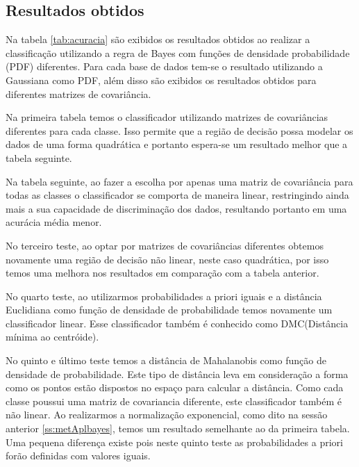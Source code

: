 \documentclass[ 
	article,			%
	11pt,				%
	oneside,			%
	a4paper,			%
	english,			%
	brazil,				%
	]{abntex2}
\begin{document}
 
\subsection{Resultados obtidos}
\label{ss:resultadosObtidos}

Na tabela \ref{tab:acuracia} são exibidos os resultados obtidos ao realizar a
classificação utilizando a regra de Bayes com funções de densidade probabilidade
(PDF) diferentes. Para cada base de dados tem-se o resultado utilizando a
Gaussiana como PDF, além disso são exibidos os resultados obtidos para
diferentes matrizes de covariância.

Na primeira tabela temos o classificador utilizando matrizes de covariâncias
diferentes para cada classe. Isso permite que a região de decisão possa modelar
os dados de uma forma quadrática e portanto espera-se um resultado melhor que a
tabela seguinte.

Na tabela seguinte, ao fazer a escolha por apenas uma matriz de covariância para
todas as classes o classificador se comporta de maneira linear, restringindo
ainda mais a sua capacidade de discriminação dos dados, resultando portanto em
uma acurácia média menor.

No terceiro teste, ao optar por matrizes de covariâncias diferentes obtemos
novamente uma região de decisão não linear, neste caso quadrática, por isso
temos uma melhora nos resultados em comparação com a tabela anterior.

No quarto teste, ao utilizarmos probabilidades a priori iguais e a distância
Euclidiana como função de densidade de probabilidade temos novamente um
classificador linear. Esse classificador também é conhecido como DMC(Distância
mínima ao centróide).

No quinto e último teste temos a distância de Mahalanobis como função de
densidade de probabilidade. Este tipo de distância leva em consideração a forma
como os pontos estão dispostos no espaço para calcular a distância. Como cada
classe poussui uma matriz de covariancia diferente, este classificador também é
não linear. Ao realizarmos a normalização exponencial, como dito na sessão
anterior \ref{ss:metAplbayes}, temos um resultado semelhante ao da primeira
tabela. Uma pequena diferença existe pois neste quinto teste as probabilidades a
priori forão definidas com valores iguais.
\end{document}
